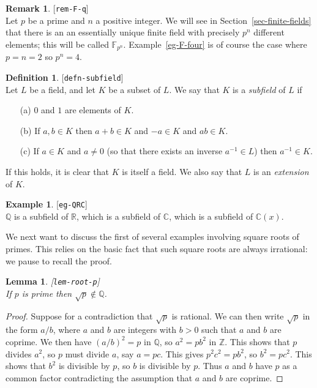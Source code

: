 \documentclass{amsart}
\newcommand{\lbl}[1]{\label{#1}\textup{[\texttt{#1}]}\ \\}
\newcommand{\lbl}{\label}
\newcommand{\Z}         {{\mathbb{Z}}}
\newcommand{\Q}         {{\mathbb{Q}}}
\newcommand{\R}         {{\mathbb{R}}}
\newcommand{\C}         {{\mathbb{C}}}
\newcommand{\F}         {{\mathbb{F}}}
\renewcommand{\:}{\colon}
\newtheorem{lemma}[theorem]{Lemma}
\theoremstyle{definition}
\newtheorem{remark}[theorem]{Remark}
\newtheorem{definition}[theorem]{Definition}
\newtheorem{example}[theorem]{Example}
\begin{document}
\begin{remark}\lbl{rem-F-q}
 Let $p$ be a prime and $n$ a positive integer.  We will see in
 Section~\ref{sec-finite-fields} that there is an an essentially
 unique finite field with precisely $p^n$ different elements; this
 will be called $\F_{p^n}$.  Example~\ref{eg-F-four} is of course the
 case where $p=n=2$ so $p^n=4$.
\end{remark}


\begin{definition}\lbl{defn-subfield}
 Let $L$ be a field, and let $K$ be a subset of $L$.  We say that $K$
 is a \emph{subfield} of $L$ if 
 \begin{itemize}
  \item[(a)] $0$ and $1$ are elements of $K$.
  \item[(b)] If $a,b\in K$ then $a+b\in K$ and $-a\in K$ and
   $ab\in K$.
  \item[(c)] If $a\in K$ and $a\neq 0$ (so that there exists an
   inverse $a^{-1}\in L$) then $a^{-1}\in K$.
 \end{itemize}
 If this holds, it is clear that $K$ is itself a field.  We also say
 that $L$ is an \emph{extension} of $K$.
\end{definition}

\begin{example}\lbl{eg-QRC}
 $\Q$ is a subfield of $\R$, which is a subfield of $\C$, which is a
 subfield of $\C(x)$.
\end{example}

We next want to discuss the first of several examples involving square
roots of primes.  This relies on the basic fact that such square roots
are always irrational: we pause to recall the proof.
\begin{lemma}\lbl{lem-root-p}
 If $p$ is prime then $\sqrt{p}\not\in\Q$.
\end{lemma}
\begin{proof}
 Suppose for a contradiction that $\sqrt{p}$ is rational.  We can then
 write $\sqrt{p}$ in the form $a/b$, where $a$ and $b$ are integers
 with $b>0$ such that $a$ and $b$ are coprime.  We then have
 $(a/b)^2=p$ in $\Q$, so $a^2=pb^2$ in $\Z$.  This shows that $p$
 divides $a^2$, so $p$ must divide $a$, say $a=pc$.  This gives
 $p^2c^2=pb^2$, so $b^2=pc^2$.  This shows that $b^2$ is divisible by
 $p$, so $b$ is divisible by $p$.  Thus $a$ and $b$ have $p$ as a
 common factor contradicting the assumption that $a$ and $b$ are
 coprime. 
\end{proof}
\end{document}
